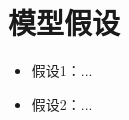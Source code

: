 \section{模型假设}\label{sec:assumptions}
\begin{itemize}
    \item 假设1：...
    \item 假设2：...
\end{itemize}
